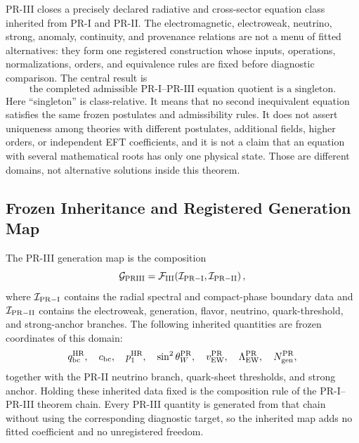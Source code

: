 \documentclass[11pt]{article}
\begin{document}
PR-III closes a precisely declared radiative and cross-sector equation class inherited from PR-I and PR-II.  The electromagnetic, electroweak, neutrino, strong, anomaly, continuity, and provenance relations are not a menu of fitted alternatives: they form one registered construction whose inputs, operations, normalizations, orders, and equivalence rules are fixed before diagnostic comparison.  The central result is
\begin{equation}
\boxed{
\text{the completed admissible PR-I--PR-III equation quotient is a singleton}.
}
\label{eq:priii-closed-equation-claim}
\end{equation}
Here ``singleton'' is class-relative.  It means that no second inequivalent equation satisfies the same frozen postulates and admissibility rules.  It does not assert uniqueness among theories with different postulates, additional fields, higher orders, or independent EFT coefficients, and it is not a claim that an equation with several mathematical roots has only one physical state. Those are different domains, not alternative solutions inside this theorem.

\subsection{Frozen Inheritance and Registered Generation Map}
\label{subsec:priii-closed-inherited-data}

The PR-III generation map is the composition
\begin{equation}
\mathcal G_{\rm PRIII}
=
\mathcal F_{\rm III}
\!\left(
\mathcal I_{\rm PR-I},
\mathcal I_{\rm PR-II}
\right),
\label{eq:priii-conditional-on-pr1-pr2}
\end{equation}
where \(\mathcal I_{\rm PR-I}\) contains the radial spectral and compact-phase boundary data and \(\mathcal I_{\rm PR-II}\) contains the electroweak, generation, flavor, neutrino, quark-threshold, and strong-anchor branches.  The
following inherited quantities are frozen coordinates of this domain:
\begin{equation}
q_{\rm bc}^{\rm HR},
\quad
c_{\rm bc},
\quad
p_1^{\rm HR},
\quad
\sin^2\theta_W^{\rm PR},
\quad
v_{\rm EW}^{\rm PR},
\quad
\Lambda_{\rm EW}^{\rm PR},
\quad
N_{\rm gen}^{\rm PR},
\end{equation}
together with the PR-II neutrino branch, quark-sheet thresholds, and strong anchor.  Holding these inherited data fixed is the composition rule of the PR-I--PR-III theorem chain.  Every PR-III quantity is generated from that chain
without using the corresponding diagnostic target, so the inherited map adds no fitted coefficient and no unregistered freedom.
\end{document}
